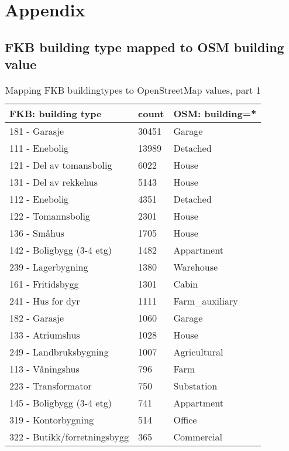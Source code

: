 \chapter{Appendix}

\section{FKB building type mapped to OSM building value}
\begin{table}[H]
\begin{tabular}{ | l | l | l | }
\hline
	FKB: building type & count & OSM: building=* \\ \hline
	181 - Garasje & 30451 & Garage \\ \hline
	111 - Enebolig & 13989 & Detached \\ \hline
	121 - Del av tomansbolig & 6022 & House \\ \hline
	131 - Del av rekkehus & 5143 & House \\ \hline
	112 - Enebolig & 4351 & Detached \\ \hline
	122 - Tomannsbolig & 2301 & House \\ \hline
	136 - Småhus & 1705 & House \\ \hline
	142 - Boligbygg (3-4 etg) & 1482 & Appartment \\ \hline
	239 - Lagerbygning & 1380 & Warehouse \\ \hline
	161 - Fritidsbygg & 1301 & Cabin \\ \hline
	241 - Hus for dyr & 1111 & Farm\_auxiliary \\ \hline
	182 - Garasje & 1060 & Garage \\ \hline
	133 - Atriumshus & 1028 & House \\ \hline
	249 - Landbruksbygning & 1007 & Agricultural \\ \hline
	113 - Våningshus & 796 & Farm \\ \hline
	223 - Transformator & 750 & Substation \\ \hline
	145 - Boligbygg (3-4 etg) & 741 & Appartment \\ \hline
	319 - Kontorbygning & 514 & Office \\ \hline
	322 - Butikk/forretningsbygg & 365 & Commercial \\ \hline
\end{tabular}
\caption{Mapping FKB buildingtypes to OpenStreetMap values, part 1}
\label{tab:fkbtoosmdel1}
\end{table}

